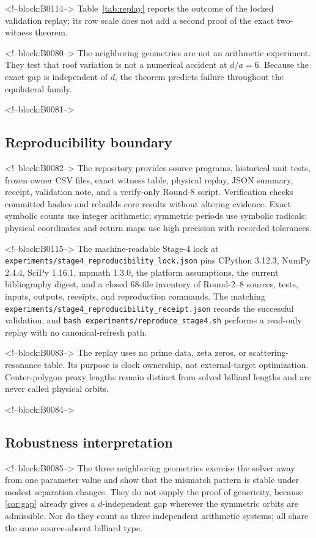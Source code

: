 \documentclass[11pt,a4paper]{article}
\theoremstyle{definition}
\theoremstyle{remark}
\begin{document}
<!--block:B0114-->
Table~\ref{tab:replay} reports the outcome of the locked validation replay; its row scale does not add a second proof of the exact two-witness theorem.

<!--block:B0080-->
The neighboring geometries are not an arithmetic experiment. They test that roof variation is not a numerical accident at \(d/a=6\). Because the exact gap is independent of \(d\), the theorem predicts failure throughout the equilateral family.

<!--block:B0081-->
\subsection{Reproducibility boundary}

<!--block:B0082-->
The repository provides source programs, historical unit tests, frozen owner CSV files, exact witness table, physical replay, JSON summary, receipt, validation note, and a verify-only Round-8 script. Verification checks committed hashes and rebuilds core results without altering evidence. Exact symbolic counts use integer arithmetic; symmetric periods use symbolic radicals; physical coordinates and return maps use high precision with recorded tolerances.

<!--block:B0115-->
The machine-readable Stage-4 lock at \texttt{experiments/stage4\_reproducibility\_lock.json} pins CPython 3.12.3, NumPy 2.4.4, SciPy 1.16.1, mpmath 1.3.0, the platform assumptions, the current bibliography digest, and a closed 68-file inventory of Round-2--8 sources, tests, inputs, outputs, receipts, and reproduction commands. The matching \texttt{experiments/stage4\_reproducibility\_receipt.json} records the successful validation, and \texttt{bash experiments/reproduce\_stage4.sh} performs a read-only replay with no canonical-refresh path.

<!--block:B0083-->
The replay uses no prime data, zeta zeros, or scattering-resonance table. Its purpose is clock ownership, not external-target optimization. Center-polygon proxy lengths remain distinct from solved billiard lengths and are never called physical orbits.

<!--block:B0084-->
\subsection{Robustness interpretation}

<!--block:B0085-->
The three neighboring geometries exercise the solver away from one parameter value and show that the mismatch pattern is stable under modest separation changes. They do not supply the proof of genericity, because \cref{cor:gap} already gives a \(d\)-independent gap wherever the symmetric orbits are admissible. Nor do they count as three independent arithmetic systems; all share the same source-absent billiard type.
\end{document}
